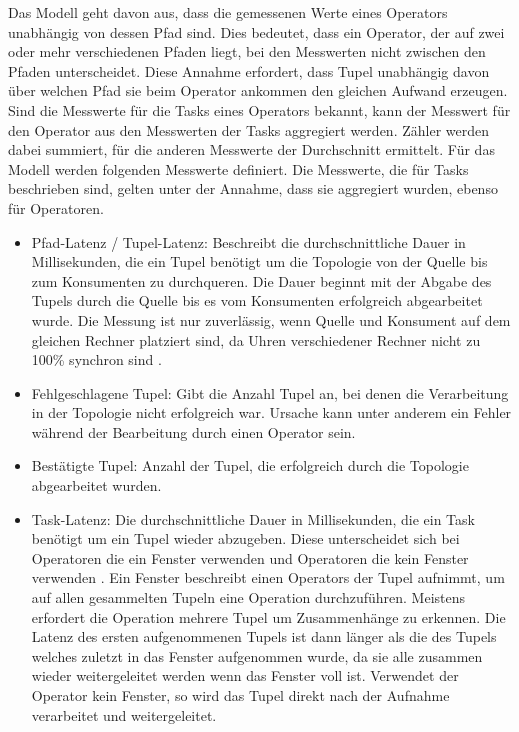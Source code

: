 Das Modell geht davon aus, dass die gemessenen Werte eines Operators unabhängig von dessen Pfad sind.
Dies bedeutet, dass ein Operator, der auf zwei oder mehr verschiedenen Pfaden liegt, bei den Messwerten nicht zwischen den Pfaden unterscheidet.
Diese Annahme erfordert, dass Tupel unabhängig davon über welchen Pfad sie beim Operator ankommen den gleichen Aufwand erzeugen.
Sind die Messwerte für die Tasks eines Operators bekannt, kann der Messwert für den Operator aus den Messwerten der Tasks aggregiert werden.
Zähler werden dabei summiert, für die anderen Messwerte der Durchschnitt ermittelt.
Für das Modell werden folgenden Messwerte definiert.
Die Messwerte, die für Tasks beschrieben sind, gelten unter der Annahme, dass sie aggregiert wurden, ebenso für Operatoren.

\begin{itemize}
\item{Pfad-Latenz / Tupel-Latenz: Beschreibt die durchschnittliche Dauer in Millisekunden, die ein Tupel benötigt um die Topologie von der Quelle bis zum Konsumenten zu durchqueren. 
Die Dauer beginnt mit der Abgabe des Tupels durch die Quelle bis es vom Konsumenten erfolgreich abgearbeitet wurde. 
Die Messung ist nur zuverlässig, wenn Quelle und Konsument auf dem gleichen Rechner platziert sind, da Uhren verschiedener Rechner nicht zu 100\% synchron sind \cite{goggel_vergleich_20180}.}
\item{Fehlgeschlagene Tupel: Gibt die Anzahl Tupel an,  bei denen die Verarbeitung in der Topologie nicht erfolgreich war.
Ursache kann unter anderem ein Fehler während der Bearbeitung durch einen Operator sein.}
\item{Bestätigte Tupel: Anzahl der Tupel, die erfolgreich durch die Topologie abgearbeitet wurden.}
\item{Task-Latenz: Die durchschnittliche Dauer in Millisekunden, die ein Task benötigt um ein Tupel wieder abzugeben. 
Diese unterscheidet sich bei Operatoren die ein Fenster verwenden und Operatoren die kein Fenster verwenden  \cite{lohrmann_elastic_2015}.
Ein Fenster beschreibt einen Operators der Tupel aufnimmt, um auf allen gesammelten Tupeln eine Operation durchzuführen.
Meistens erfordert die Operation mehrere Tupel um Zusammenhänge zu erkennen.
Die Latenz des ersten aufgenommenen Tupels ist dann länger als die des Tupels welches zuletzt in das Fenster aufgenommen wurde, da sie alle zusammen wieder weitergeleitet werden wenn das Fenster voll ist. 
Verwendet der Operator kein Fenster, so wird das Tupel direkt nach der Aufnahme verarbeitet und weitergeleitet.
}
\end{itemize}
